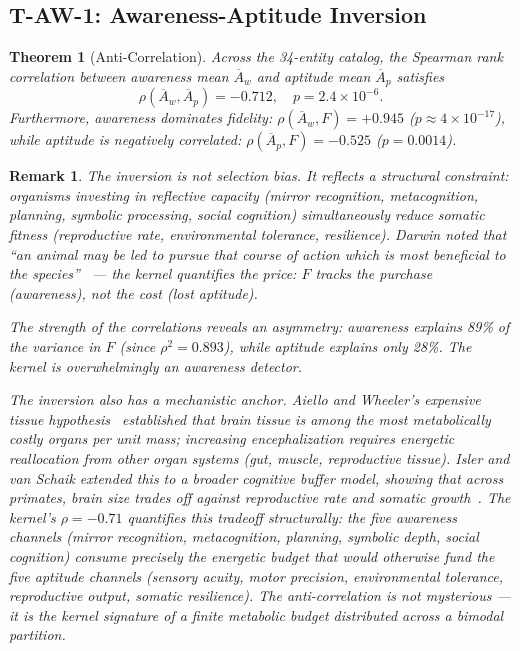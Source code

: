 \documentclass[
  aps,
  prd,
  twocolumn,
  superscriptaddress,
  nofootinbib,
  floatfix
]{revtex4-2}
\newtheorem{theorem}{Theorem}
\newtheorem{remark}{Remark}
\newcommand{\beq}{\begin{equation}}
\newcommand{\eeq}{\end{equation}}
\newcommand{\Aw}{\overline{A}_{\!w}}
\newcommand{\Ap}{\overline{A}_{\!p}}
\begin{document}
\subsection{T-AW-1: Awareness-Aptitude Inversion}

\begin{theorem}[Anti-Correlation]\label{thm:TAW1}
Across the 34-entity catalog, the Spearman rank correlation
between awareness mean $\Aw$ and aptitude mean $\Ap$ satisfies
\beq\label{eq:inversion}
  \rho(\Aw, \Ap) = -0.712, \quad p = 2.4 \times 10^{-6}.
\eeq
Furthermore, awareness dominates fidelity:
$\rho(\Aw, F) = +0.945$ ($p \approx 4 \times 10^{-17}$),
while aptitude is negatively correlated:
$\rho(\Ap, F) = -0.525$ ($p = 0.0014$).
\end{theorem}

\begin{remark}
The inversion is not selection bias.  It reflects a
structural constraint: organisms investing in reflective
capacity (mirror recognition, metacognition, planning,
symbolic processing, social cognition) simultaneously
reduce somatic fitness (reproductive rate, environmental
tolerance, resilience).  Darwin noted that ``an animal
may be led to pursue that course of action which is most
beneficial to the
species''~\cite{darwin1859origin} --- the kernel quantifies
the price: $F$ tracks the purchase (awareness), not the
cost (lost aptitude).

The strength of the correlations reveals an asymmetry:
awareness explains 89\% of the variance in $F$ (since
$\rho^2 = 0.893$), while aptitude explains only
28\%.  The kernel is overwhelmingly an awareness detector.

The inversion also has a mechanistic anchor.
Aiello and Wheeler's \emph{expensive tissue
hypothesis}~\cite{aiello1995expensive} established that
brain tissue is among the most metabolically costly organs
per unit mass; increasing encephalization requires energetic
reallocation from other organ systems (gut, muscle,
reproductive tissue).  Isler and van Schaik extended this
to a broader \emph{cognitive buffer} model, showing that
across primates, brain size trades off against reproductive
rate and somatic growth~\cite{isler2009expensive}.
The kernel's $\rho = -0.71$ quantifies this tradeoff
structurally: the five awareness channels (mirror
recognition, metacognition, planning, symbolic depth,
social cognition) consume precisely the energetic budget
that would otherwise fund the five aptitude channels
(sensory acuity, motor precision, environmental tolerance,
reproductive output, somatic resilience).  The anti-correlation
is not mysterious --- it is the kernel signature of a finite
metabolic budget distributed across a bimodal partition.
\end{remark}
\end{document}
